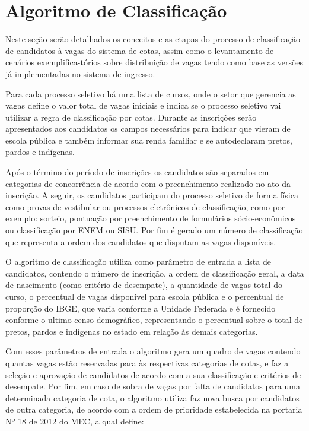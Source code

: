\section{Algoritmo de Classificação}
\label{algoritimodeclassificacao}

Neste seção serão detalhados os conceitos e as etapas do processo de classificação de candidatos à vagas do sistema de cotas, assim como o levantamento de cenários exemplifica-tórios sobre distribuição de vagas tendo como base as versões já implementadas no sistema de ingresso.

Para cada processo seletivo há uma lista de cursos, onde o setor que gerencia as vagas define o valor total de vagas iniciais e indica se o processo seletivo vai utilizar a regra de classificação por cotas. Durante as inscrições serão apresentados aos candidatos os campos necessários para indicar que vieram de escola pública e também informar sua renda familiar e se autodeclaram pretos, pardos e indígenas.

Após o término do período de inscrições os candidatos são separados em categorias de concorrência de acordo com o preenchimento realizado no ato da inscrição. A seguir, os candidatos participam do processo seletivo de forma física como provas de vestibular ou processos eletrônicos de classificação, como por exemplo: sorteio, pontuação por preenchimento de formulários sócio-econômicos ou classificação por \gls{ENEM} ou \gls{SISU}. Por fim é gerado um número de classificação que representa a ordem dos candidatos que disputam as vagas disponíveis.

O algoritmo de classificação utiliza como parâmetro de entrada a lista de candidatos, contendo o número de inscrição, a ordem de classificação geral, a data de nascimento (como critério de desempate), a quantidade de vagas total do curso, o percentual de vagas disponível para escola pública e o percentual de proporção do \gls{IBGE}, que varia conforme a Unidade Federada e é fornecido conforme o ultimo censo demográfico, representando o percentual sobre o total de pretos, pardos e indígenas no estado em relação às demais categorias.

Com esses parâmetros de entrada o algoritmo gera um quadro de vagas contendo quantas vagas estão reservadas para às respectivas categorias de cotas, e faz a seleção e aprovação de candidatos de acordo com a sua classificação e critérios de desempate. Por fim, em caso de sobra de vagas por falta de candidatos para uma determinada categoria de cota, o algoritmo utiliza faz nova busca por candidatos de outra categoria, de acordo com a ordem de prioridade estabelecida na portaria Nº 18 de 2012 do \gls{MEC}, a qual define:

